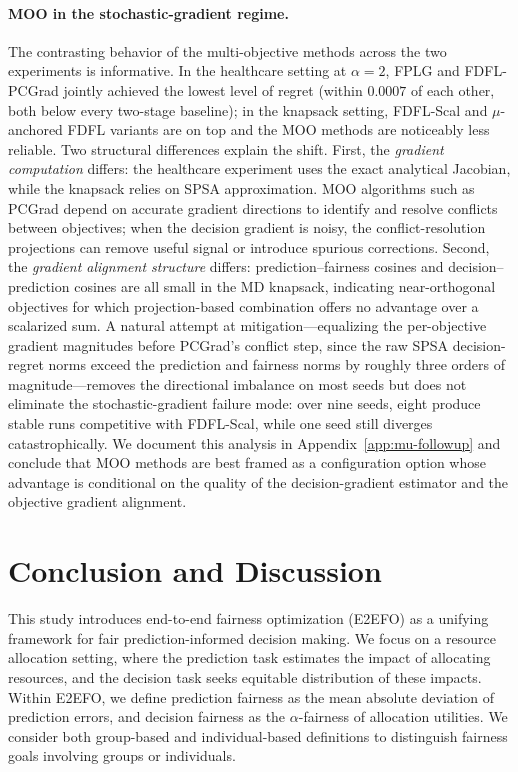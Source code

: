 \documentclass[ijoc,sglanonrev]{informs4}
\begin{document}
\paragraph{MOO in the stochastic-gradient regime.}
The contrasting behavior of the multi-objective methods across the two
experiments is informative. In the healthcare setting at $\alpha = 2$,
FPLG and FDFL-PCGrad jointly achieved the lowest level of regret (within
$0.0007$ of each other, both below every two-stage baseline); in the
knapsack setting, FDFL-Scal and $\mu$-anchored FDFL variants are on
top and the MOO methods are noticeably less reliable. Two structural
differences explain the shift. First, the \textit{gradient computation}
differs: the healthcare experiment uses the exact analytical Jacobian,
while the knapsack relies on SPSA approximation. MOO algorithms such
as PCGrad depend on accurate gradient directions to identify and
resolve conflicts between objectives; when the decision gradient is
noisy, the conflict-resolution projections can remove useful signal or
introduce spurious corrections. Second, the \textit{gradient alignment
structure} differs: prediction--fairness cosines and decision--prediction
cosines are all small in the MD knapsack, indicating near-orthogonal
objectives for which projection-based combination offers no advantage
over a scalarized sum. A natural attempt at mitigation---equalizing
the per-objective gradient magnitudes before PCGrad's conflict step,
since the raw SPSA decision-regret norms exceed the prediction and
fairness norms by roughly three orders of magnitude---removes the
directional imbalance on most seeds but does not eliminate the
stochastic-gradient failure mode: over nine seeds, eight produce
stable runs competitive with FDFL-Scal, while one seed still diverges
catastrophically. We
document this analysis in Appendix~\ref{app:mu-followup} and conclude
that MOO methods are best framed as a configuration option whose
advantage is conditional on the quality of the decision-gradient
estimator and the objective gradient alignment.



\section{Conclusion and Discussion}\label{sec:conclusion}
This study introduces end-to-end fairness optimization (E2EFO) as a unifying framework for fair prediction-informed decision making. We focus on a resource allocation setting, where the prediction task estimates the impact of allocating resources, and the decision task seeks equitable distribution of these impacts. Within E2EFO, we define prediction fairness as the mean absolute deviation of prediction errors, and decision fairness as the $\alpha$-fairness of allocation utilities. We consider both group-based and individual-based definitions to distinguish fairness goals involving groups or individuals. 
\end{document}
